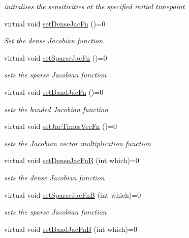 \begin{DoxyCompactItemize}
\begin{DoxyCompactList}\small\item\em initialises the sensitivities at the specified initial timepoint \end{DoxyCompactList}\item 
virtual void \mbox{\hyperlink{classamici_1_1_solver_abb3355b298fb576e7bcd3f333d14b5af}{set\+Dense\+Jac\+Fn}} ()=0
\begin{DoxyCompactList}\small\item\em Set the dense Jacobian function. \end{DoxyCompactList}\item 
virtual void \mbox{\hyperlink{classamici_1_1_solver_aabf68f0f9ee981fd320420f3ba5c5f8d}{set\+Sparse\+Jac\+Fn}} ()=0
\begin{DoxyCompactList}\small\item\em sets the sparse Jacobian function \end{DoxyCompactList}\item 
virtual void \mbox{\hyperlink{classamici_1_1_solver_a1ac4c2c1cf9df3c478ade2b1d5e728c6}{set\+Band\+Jac\+Fn}} ()=0
\begin{DoxyCompactList}\small\item\em sets the banded Jacobian function \end{DoxyCompactList}\item 
virtual void \mbox{\hyperlink{classamici_1_1_solver_a151ebe8ad33f1e635289c869d1412375}{set\+Jac\+Times\+Vec\+Fn}} ()=0
\begin{DoxyCompactList}\small\item\em sets the Jacobian vector multiplication function \end{DoxyCompactList}\item 
virtual void \mbox{\hyperlink{classamici_1_1_solver_a1081b1ac835a2bf9221552a07d04ef4d}{set\+Dense\+Jac\+FnB}} (int which)=0
\begin{DoxyCompactList}\small\item\em sets the dense Jacobian function \end{DoxyCompactList}\item 
virtual void \mbox{\hyperlink{classamici_1_1_solver_a101c62151da172cc06a025a3060b50de}{set\+Sparse\+Jac\+FnB}} (int which)=0
\begin{DoxyCompactList}\small\item\em sets the sparse Jacobian function \end{DoxyCompactList}\item 
virtual void \mbox{\hyperlink{classamici_1_1_solver_a1040308561e87b1e2d24c3ab9581e14d}{set\+Band\+Jac\+FnB}} (int which)=0

\end{DoxyCompactItemize}
